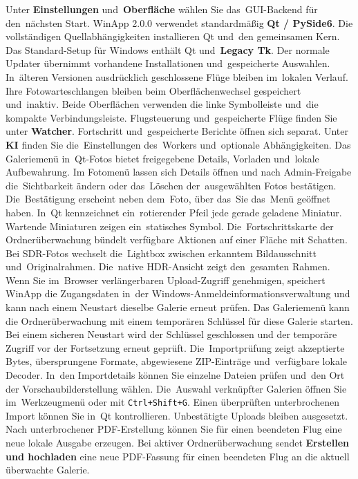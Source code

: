 \documentclass[11pt,a4paper]{article}
\newcommand{\ui}[1]{\textbf{#1}}
\newcommand{\codeword}[1]{\nolinkurl{#1}}
\begin{document}
Unter \ui{Einstellungen} und~\ui{Oberfläche} wählen Sie das~GUI-Backend
für den~nächsten Start. WinApp 2.0.0 verwendet standardmäßig \ui{Qt / PySide6}.
Die vollständigen Quellabhängigkeiten installieren Qt und~den gemeinsamen Kern.
Das Standard-Setup für Windows enthält Qt und~\ui{Legacy Tk}.
Der normale Updater übernimmt vorhandene Installationen und~gespeicherte Auswahlen.
In~älteren Versionen ausdrücklich geschlossene Flüge bleiben im~lokalen Verlauf.
Ihre Fotowarteschlangen bleiben beim Oberflächenwechsel gespeichert und~inaktiv.
Beide Oberflächen verwenden die linke Symbolleiste und~die kompakte Verbindungsleiste.
Flugsteuerung und~gespeicherte Flüge finden Sie unter \ui{Watcher}.
Fortschritt und~gespeicherte Berichte öffnen sich separat. Unter \ui{KI}
finden Sie die~Einstellungen des~Workers und~optionale Abhängigkeiten.
Das Galeriemenü in~Qt-Fotos bietet freigegebene Details, Vorladen und~lokale
Aufbewahrung. Im Fotomenü lassen sich Details öffnen und nach Admin-Freigabe
die~Sichtbarkeit ändern oder das~Löschen der~ausgewählten Fotos bestätigen.
Die~Bestätigung erscheint neben dem~Foto, über das~Sie das~Menü geöffnet haben.
In~Qt kennzeichnet ein~rotierender Pfeil jede gerade geladene Miniatur.
Wartende Miniaturen zeigen ein~statisches Symbol. Die~Fortschrittskarte der
Ordnerüberwachung bündelt verfügbare Aktionen auf einer Fläche mit Schatten.
Bei SDR-Fotos wechselt die~Lightbox zwischen erkanntem Bildausschnitt
und~Originalrahmen. Die~native HDR-Ansicht zeigt den~gesamten Rahmen.
Wenn Sie im~Browser verlängerbaren Upload-Zugriff genehmigen, speichert
WinApp die Zugangsdaten in~der Windows-Anmeldeinformationsverwaltung und
kann nach einem Neustart dieselbe Galerie erneut prüfen.
Das Galeriemenü kann die Ordnerüberwachung mit einem temporären Schlüssel
für diese Galerie starten. Bei einem sicheren Neustart wird der Schlüssel
geschlossen und der temporäre Zugriff vor der Fortsetzung erneut geprüft.
Die~Importprüfung zeigt akzeptierte Bytes, übersprungene Formate, abgewiesene
ZIP-Einträge und~verfügbare lokale Decoder. In~den Importdetails können Sie
einzelne Dateien prüfen und~den Ort der Vorschaubilderstellung wählen.
Die~Auswahl verknüpfter Galerien öffnen Sie im~Werkzeugmenü oder mit
\codeword{Ctrl+Shift+G}.
Einen überprüften unterbrochenen Import können Sie in~Qt kontrollieren.
Unbestätigte Uploads bleiben ausgesetzt. Nach unterbrochener PDF-Erstellung
können Sie für einen beendeten Flug eine neue lokale Ausgabe erzeugen.
Bei aktiver Ordnerüberwachung sendet \ui{Erstellen und hochladen} eine
neue PDF-Fassung für einen beendeten Flug an die aktuell überwachte Galerie.
\end{document}
